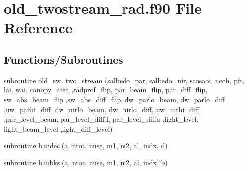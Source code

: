\hypertarget{old__twostream__rad_8f90}{}\section{old\+\_\+twostream\+\_\+rad.\+f90 File Reference}
\label{old__twostream__rad_8f90}
\subsection*{Functions/\+Subroutines}
\begin{DoxyCompactItemize}
\item 
subroutine \hyperlink{old__twostream__rad_8f90_ac90aec0e7fa711f6b96d200ae35c737a}{old\+\_\+sw\+\_\+two\+\_\+stream} (salbedo\+\_\+par, salbedo\+\_\+nir, scosaoi, ncoh, pft, lai, wai, canopy\+\_\+area                                                                                                               ,radprof\+\_\+flip, par\+\_\+beam\+\_\+flip, par\+\_\+diff\+\_\+flip, sw\+\_\+abs\+\_\+beam\+\_\+flip                                                                                                                           ,sw\+\_\+abs\+\_\+diff\+\_\+flip, dw\+\_\+parlo\+\_\+beam, dw\+\_\+parlo\+\_\+diff                                                                                                                                                                               ,uw\+\_\+parhi\+\_\+diff, dw\+\_\+nirlo\+\_\+beam, dw\+\_\+nirlo\+\_\+diff, uw\+\_\+nirhi\+\_\+diff                                                                                                                                   ,par\+\_\+level\+\_\+beam, par\+\_\+level\+\_\+diffd, par\+\_\+level\+\_\+diffu                                                                                                                                                                       ,light\+\_\+level, light\+\_\+beam\+\_\+level                                                                                                                                                                                                                                               ,light\+\_\+diff\+\_\+level)
\item 
subroutine \hyperlink{old__twostream__rad_8f90_a6ebe8b542c9350d34aae0515753b29bf}{bandec} (a, ntot, nuse, m1, m2, al, indx, d)
\item 
subroutine \hyperlink{old__twostream__rad_8f90_a43f0966137654368f596fcb9d9019b82}{banbks} (a, ntot, nuse, m1, m2, al, indx, b)

\end{DoxyCompactItemize}
